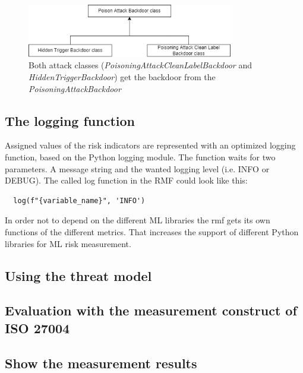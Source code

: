 \begin{figure}[ht!]
  \centering
  \includegraphics[width=9cm]{pictures/attack_relationship.png}
  \caption{Both attack classes (\textit{PoisoningAttackCleanLabelBackdoor} and \textit{HiddenTriggerBackdoor}) get the backdoor from the \textit{PoisoningAttackBackdoor}}
  \label{fig:relation_risk_ind}
\end{figure}

\subsection{The logging function}

Assigned values of the risk indicators are represented with an optimized logging function, based on the Python logging module. The function waits for two parameters. A message string and the wanted logging level (i.e. INFO or DEBUG). The called log function in the RMF could look like this:
\begin{lstlisting}
  log(f"{variable_name}", 'INFO')
\end{lstlisting}

In order not to depend on the different ML libraries the rmf gets its own functions of the different metrics. That increases the support of different Python libraries for ML risk
measurement.

\subsection{Using the threat model}
\subsection{Evaluation with the measurement construct of ISO 27004}
\subsection{Show the measurement results}
